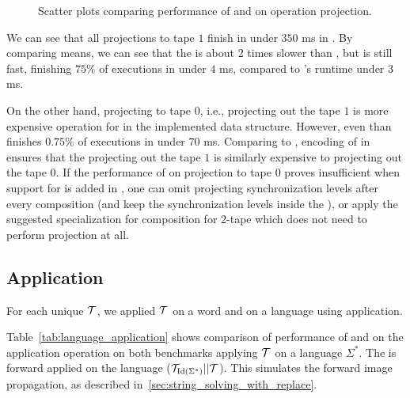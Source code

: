 \begin{figure}[ht]
    \centering
    \quad
    \caption{
      Scatter plots comparing performance of \mata and \mona on operation projection.
    }
    \label{fig:projection}%
\end{figure}

We can see that all projections to tape $1$ finish in under $350$ ms in \mata.
By comparing means, we can see that the \mata is about 2 times slower than \mona, but is still fast, finishing $75\%$ of executions in under $4$ ms, compared to \mona's runtime under $3$ ms.

On the other hand, projecting to tape $0$, i.e., projecting out the tape $1$ is more expensive operation for \mata in the implemented data structure.
However, even than \mata finishes $0.75\%$ of executions in under $70$ ms.
Comparing to \mona, encoding of \nfts in \mona ensures that the projecting out the tape $1$ is similarly expensive to projecting out the tape $0$.
If the performance of \mata on projection to tape $0$ proves insufficient when support for \nfts is added in \noodler, one can omit projecting synchronization levels after every composition (and keep the synchronization levels inside the \nft), or apply the suggested specialization for composition for $2$-tape \nfts which does not need to perform projection at all.

\subsection{Application}

For each unique \nft $\mathcal{T}$, we applied $\mathcal{T}$ on a word and on a language using \nft application.


Table~\ref{tab:language_application} shows comparison of performance of \mata and \mona on the application operation on both benchmarks applying $\mathcal{T}$ on a language $\Sigma^*$.
The \nft is forward applied on the language ($\mathcal{T}_{\text{Id}(\Sigma^*)} || \mathcal{T} $).
This simulates the forward image propagation, as described in~\ref{sec:string_solving_with_replace}.

